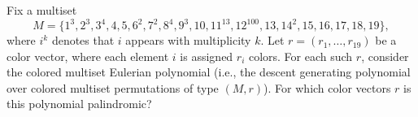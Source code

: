 Fix a multiset
\[
M=\{1^3,2^3,3^4,4,5,6^2,7^2,8^4,9^3,10,11^{13},12^{100},13,14^2,15,16,17,18,19\},
\]
where $i^k$ denotes that $i$ appears with multiplicity $k$.
Let $r=(r_1,\dots,r_{19})$ be a color vector, where each element $i$ is assigned $r_i$ colors.
For each such $r$, consider the colored multiset Eulerian polynomial (i.e., the descent generating polynomial over colored multiset permutations of type $(M,r)$).
For which color vectors $r$ is this polynomial palindromic?
